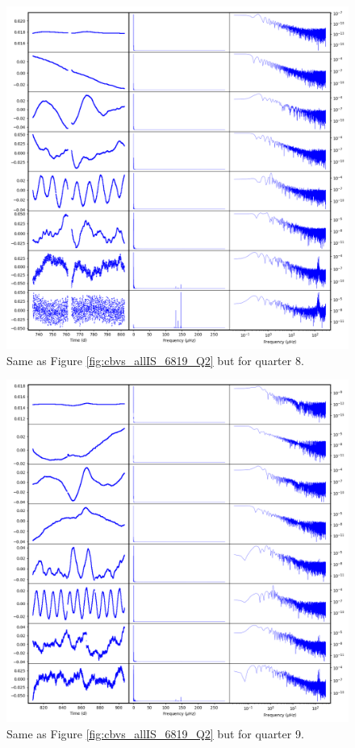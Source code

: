 \begin{figure}
    \centering
    \includegraphics[width=\linewidth]{Chapter_Appended/AppB/cbv_6819_q08.png}
    \caption{Same as Figure \ref{fig:cbvs_allIS_6819_Q2} but for quarter 8.}
    \label{fig:cbvs_allIS_6819_Q08}
\end{figure}


\begin{figure}
    \centering
    \includegraphics[width=\linewidth]{Chapter_Appended/AppB/cbv_6819_q09.png}
    \caption{Same as Figure \ref{fig:cbvs_allIS_6819_Q2} but for quarter 9.}
    \label{fig:cbvs_allIS_6819_Q09}
\end{figure}


